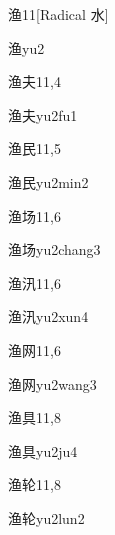 \begin{entry}{渔}{11}[Radical 水]
  \begin{phonetics}{渔}{yu2}
  \end{phonetics}
\end{entry}

\begin{entry}{渔夫}{11,4}
  \begin{phonetics}{渔夫}{yu2fu1}
  \end{phonetics}
\end{entry}

\begin{entry}{渔民}{11,5}
  \begin{phonetics}{渔民}{yu2min2}
  \end{phonetics}
\end{entry}

\begin{entry}{渔场}{11,6}
  \begin{phonetics}{渔场}{yu2chang3}
  \end{phonetics}
\end{entry}

\begin{entry}{渔汛}{11,6}
  \begin{phonetics}{渔汛}{yu2xun4}
  \end{phonetics}
\end{entry}

\begin{entry}{渔网}{11,6}
  \begin{phonetics}{渔网}{yu2wang3}
  \end{phonetics}
\end{entry}

\begin{entry}{渔具}{11,8}
  \begin{phonetics}{渔具}{yu2ju4}
  \end{phonetics}
\end{entry}

\begin{entry}{渔轮}{11,8}
  \begin{phonetics}{渔轮}{yu2lun2}
  \end{phonetics}
\end{entry}

